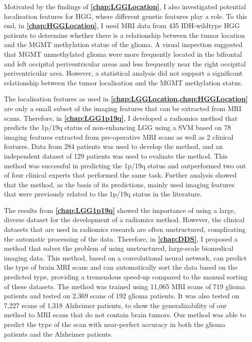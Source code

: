 Motivated by the findings of \textbf{\cref{chap:LGGLocation}}, I also investigated potential localisation features for \gls{HGG}, where different genetic features play a role.
To this end, in \textbf{\cref{chap:HGGLocation}}, I used \gls{MRI} data from 435 \gls{IDH}-wildtype \gls{HGG} patients to determine whether there is a relationship between the \gls{tumor} location and the \gls{MGMT} methylation status of the glioma.
A visual inspection suggested that \gls{MGMT} unmethylated glioma were more frequently located in the bifrontal and left occipital periventricular areas and less frequently near the right occipital periventricular area.
However, a statistical analysis did not support a significant relationship between the \gls{tumor} localisation and the \gls{MGMT} methylation status.

The localisation features as used in \textbf{\cref{chap:LGGLocation,chap:HGGLocation}} are only a small subset of the imaging features that can be extracted from \gls{MRI} scans.
Therefore, in \textbf{\cref{chap:LGG1p19q}}, I developed a radiomics method that predicts the 1p/19q status of non-enhancing \gls{LGG} using a \gls{SVM} based on 78 imaging features extracted from pre-operative \gls{MRI} scans as well as 2 clinical features.
Data from 284 patients was used to develop the method, and an independent dataset of 129 patients was used to evaluate the method.
This method was successful in predicting the 1p/19q status and outperformed two out of four clinical experts that performed the same task.
Further analysis showed that the method, as the basis of its predictions, mainly used imaging features that were previously related to the 1p/19q status in the literature.

The results from \textbf{\cref{chap:LGG1p19q}} showed the importance of using a large, diverse dataset for the development of a radiomics method.
However, the clinical datasets that are used in radiomics research are often unstructured, complicating the automatic processing of the data.
Therefore, in \textbf{\cref{chap:DDS}}, I proposed a method that solves the problem of using unstructured, large-scale biomedical imaging data.
This method, based on a convolutional neural network, can  predict the type of brain \gls{MRI} scans and can automatically sort the data based on the predicted type, providing a tremendous speed-up compared to the manual sorting of these datasets.
The method was trained using 11,065 \gls{MRI} scans of 719 glioma patients and tested on 2,369 scans of 192 glioma patients.
It was also tested on 7,227 scans of 1,318 Alzheimer patients, to show the generalizability of our method to \gls{MRI} scans that do not contain brain \glspl{tumor}.
Our method was able to predict the type of the scan with near-perfect accuracy in both the glioma patients and the Alzheimer patients.

